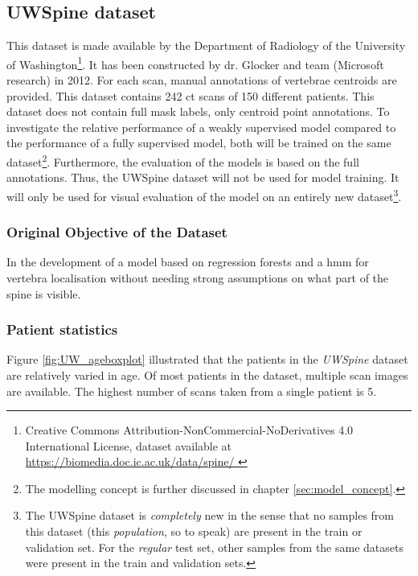 \subsection{UWSpine dataset\label{sec:UWspine}}
 
This dataset is made available by the Department of Radiology of the University of Washington\footnote{Creative Commons Attribution-NonCommercial-NoDerivatives 4.0 International License, dataset available at \url{
      https://biomedia.doc.ic.ac.uk/data/spine/  
    }}.
It has been constructed by dr. Glocker and team \cite{Glocker2012,Glocker2013} (Microsoft research) in 2012.
For each scan, manual annotations of vertebrae centroids are provided.
This dataset contains 242 \acrshort{ct} scans of 150 different patients.
This dataset does not contain full mask labels, only centroid point annotations.
To investigate the relative performance of a weakly supervised model compared to the performance of a fully supervised model, both will be trained on the same dataset\footnote{The modelling concept is further discussed in chapter \ref{sec:model_concept}.}.
Furthermore, the evaluation of the models is based on the full annotations.
Thus, the UWSpine dataset will not be used for model training.
It will only be used for visual evaluation of the model on an entirely new dataset\footnote{The UWSpine dataset is \textit{completely} new in the sense that no samples from this dataset (this \textit{population}, so to speak) are present in the train or validation set.
For the \textit{regular} test set, other samples from the same datasets were present in the train and validation sets.}.


\subsubsection{Original Objective of the Dataset}

In \cite{Glocker2012,Glocker2013} the development of a model based on regression forests and a \acrfull{hmm} for vertebra localisation without needing strong assumptions on what part of the spine is visible.

\subsubsection{Patient statistics}


Figure \ref{fig:UW_ageboxplot} illustrated that the patients in the \textit{UWSpine} dataset are relatively varied in age.
Of most patients in the dataset, multiple scan images are available.
The highest number of scans taken from a single patient is 5.


